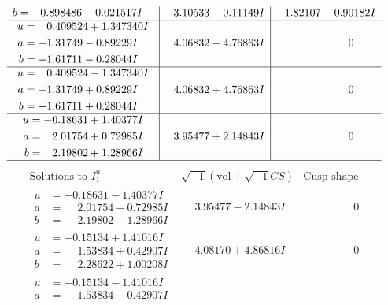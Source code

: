 \documentclass[1p]{elsarticle_modified}
\theoremstyle{definition}
\newcommand{\I}{\sqrt{-1}}
\begin{document}
$$\begin{array}{c|c|c}
\begin{aligned}
b &= \phantom{-}0.898486 - 0.021517 I\end{aligned}
 & \phantom{-}3.10533 - 0.11149 I & \phantom{-}1.82107 - 0.90182 I \\ \hline\begin{aligned}
u &= \phantom{-}0.409524 + 1.347340 I \\
a &= -1.31749 - 0.89229 I \\
b &= -1.61711 - 0.28044 I\end{aligned}
 & \phantom{-}4.06832 - 4.76863 I & \phantom{-0.000000 } 0 \\ \hline\begin{aligned}
u &= \phantom{-}0.409524 - 1.347340 I \\
a &= -1.31749 + 0.89229 I \\
b &= -1.61711 + 0.28044 I\end{aligned}
 & \phantom{-}4.06832 + 4.76863 I & \phantom{-0.000000 } 0 \\ \hline\begin{aligned}
u &= -0.18631 + 1.40377 I \\
a &= \phantom{-}2.01754 + 0.72985 I \\
b &= \phantom{-}2.19802 + 1.28966 I\end{aligned}
 & \phantom{-}3.95477 + 2.14843 I & \phantom{-0.000000 } 0\\
 \hline 
 \end{array}$$\newpage$$\begin{array}{c|c|c}  
\text{Solutions to }I^u_{1}& \I (\text{vol} + \sqrt{-1}CS) & \text{Cusp shape}\\
 \hline 
\begin{aligned}
u &= -0.18631 - 1.40377 I \\
a &= \phantom{-}2.01754 - 0.72985 I \\
b &= \phantom{-}2.19802 - 1.28966 I\end{aligned}
 & \phantom{-}3.95477 - 2.14843 I & \phantom{-0.000000 } 0 \\ \hline\begin{aligned}
u &= -0.15134 + 1.41016 I \\
a &= \phantom{-}1.53834 + 0.42907 I \\
b &= \phantom{-}2.28622 + 1.00208 I\end{aligned}
 & \phantom{-}4.08170 + 4.86816 I & \phantom{-0.000000 } 0 \\ \hline\begin{aligned}
u &= -0.15134 - 1.41016 I \\
a &= \phantom{-}1.53834 - 0.42907 I \\

\end{aligned}
\end{array}$$
\end{document}

